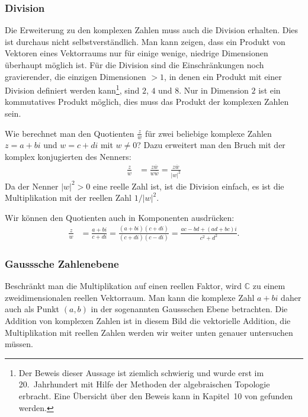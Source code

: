 \subsubsection{Division}
Die Erweiterung zu den komplexen Zahlen muss auch die Division erhalten.
Dies ist durchaus nicht selbstverständlich.
Man kann zeigen, dass ein Produkt von Vektoren eines Vektorraums nur für
einige wenige, niedrige Dimensionen überhaupt möglich ist.
Für die Division sind die Einschränkungen noch gravierender, die einzigen
Dimensionen $>1$, in denen ein Produkt mit einer Division definiert werden
kann\footnote{Der Beweis dieser Aussage ist ziemlich schwierig und wurde
erst im 20.~Jahrhundert mit Hilfe der Methoden der algebraischen Topologie
erbracht. Eine Übersicht über den Beweis kann in Kapitel~10 von
\cite{buch:ebbinghaus} gefunden werden.}, sind $2$, $4$ und $8$.
Nur in Dimension $2$ ist ein kommutatives Produkt möglich, dies muss das
Produkt der komplexen Zahlen sein.

Wie berechnet man den Quotienten $\frac{z}{w}$ für zwei beliebige komplexe
Zahlen $z=a+bi$ und $w=c+di$ mit $w\ne 0$?
Dazu erweitert man den Bruch mit der komplex konjugierten des Nenners:
\begin{align*}
\frac{z}{w}
&=
\frac{z\overline{w}}{w\overline{w}}
=
\frac{z\overline{w}}{|w|^2}
\end{align*}
Da der Nenner $|w|^2>0$ eine reelle Zahl ist, ist die Division einfach,
es ist die Multiplikation mit der reellen Zahl $1/|w|^2$.

Wir können den Quotienten auch in Komponenten ausdrücken:
\begin{align*}
\frac{z}{w}
&=
\frac{a+bi}{c+di}
=
\frac{(a+bi)(c+di)}{(c+di)(c-di)}
=
\frac{ac-bd +(ad+bc)i}{c^2+d^2}.
\end{align*}

\subsubsection{Gausssche Zahlenebene}
Beschränkt man die Multiplikation auf einen reellen Faktor, wird $\mathbb{C}$
zu einem zweidimensionalen reellen Vektorraum.
Man kann die komplexe Zahl $a+bi$ daher auch als Punkt $(a,b)$ in der
sogenannten Gaussschen Ebene betrachten.
Die Addition von komplexen Zahlen ist in diesem Bild die vektorielle
Addition, die Multiplikation mit reellen Zahlen werden wir weiter unten
genauer untersuchen müssen.

